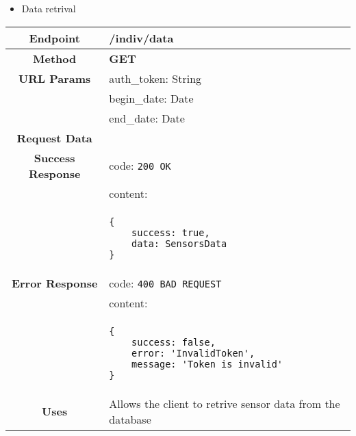     \begin{itemize}
        \item Data retrival
    \end{itemize}
    \begin{adjustwidth}{1cm}{}
        \begin{longtable}{|c|l|}
            \hline
            \textbf{Endpoint} & /indiv/data \\
            \hline
            \textbf{Method} & \textbf{GET} \\
            \hline
            \textbf{URL Params} &  auth\_token: String \\
            & begin\_date: Date \\
            & end\_date: Date \\
            \hline
            \textbf{Request Data} &  \\
            \hline
            \textbf{Success Response} & code: \texttt{200 OK} \\
            &                           content: \\
            & \begin{minipage}[t]{0.5\textwidth}
                \begin{adjustwidth}{1.5cm}{}
                \begin{verbatim}
{
    success: true, 
    data: SensorsData
}
                \end{verbatim}
                \end{adjustwidth}
              \end{minipage} \\
              \hline
            \textbf{Error Response} & code: \texttt{400 BAD REQUEST} \\
            &                         content: \\
            & \begin{minipage}[t]{0.7\textwidth}
                \begin{adjustwidth}{1.5cm}{}
                \begin{verbatim}
{
    success: false, 
    error: 'InvalidToken',
    message: 'Token is invalid'
}
                \end{verbatim}
                \end{adjustwidth}
              \end{minipage} \\
              \hline
            \textbf{Uses} & Allows the client to retrive sensor data from the database \\
            \hline
        \end{longtable}
    \end{adjustwidth}
    
